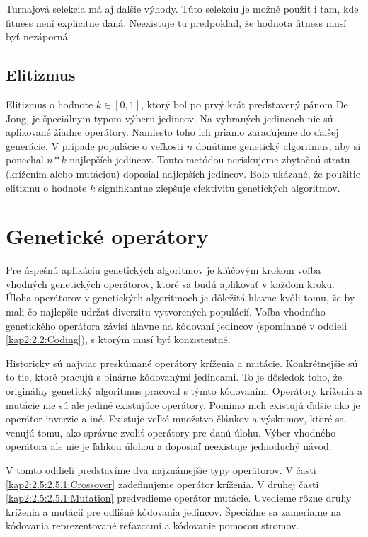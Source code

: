 Turnajová selekcia má aj ďalšie výhody.
Túto selekciu je možné použiť i tam, kde fitness není explicitne daná. Neexistuje tu predpoklad, že hodnota fitness musí byť nezáporná.

\subsection{Elitizmus}\label{kap2:2.4:2.4.3:Elitism}
Elitizmus o hodnote $k\in[0,1]$, ktorý bol po prvý krát predstavený pánom De Jong, je špeciálnym typom výberu jedincov. Na vybraných jedincoch nie sú aplikované žiadne operátory. Namiesto toho ich priamo zaraďujeme do ďalšej generácie. V prípade populácie o veľkosti $n$ donútime genetický algoritmus, aby si ponechal $n*k$ najlepších jedincov. Touto metódou neriskujeme zbytočnú stratu (krížením alebo mutáciou) doposiaľ najlepších jedincov. Bolo ukázané, že použitie elitizmu o hodnote $k$ signifikantne zlepšuje efektivitu genetických algoritmov.

\section{Genetické operátory}\label{kap2:2.5:Operators}
Pre úspešnú aplikáciu genetických algoritmov je kľúčovým krokom voľba vhodných genetických operátorov, ktoré sa budú aplikovať v každom kroku. Úloha operátorov v genetických algoritmoch je dôležitá hlavne kvôli tomu, že by mali čo najlepšie udržať diverzitu vytvorených populácií. Voľba vhodného genetického operátora závisí hlavne na kódovaní jedincov (spomínané v oddieli \ref{kap2:2.2:Coding}), s ktorým musí byť konzistentné.

Historicky sú najviac preskúmané operátory kríženia a mutácie. Konkrétnejšie sú to tie, ktoré pracujú s binárne kódovanými jedincami. To je dôsledok toho, že originálny genetický algoritmus pracoval s týmto kódovaním. Operátory kríženia a mutácie nie sú ale jediné existujúce operátory. Pomimo nich existujú ďalšie ako je operátor inverzie a iné.
Existuje veľké množstvo článkov a výskumov, ktoré sa venujú tomu, ako správne zvoliť operátory pre danú úlohu. Výber vhodného operátora ale nie je ľahkou úlohou a doposiaľ neexistuje jednoduchý návod.

V tomto oddieli predstavíme dva najznámejšie typy operátorov. V časti \ref{kap2:2.5:2.5.1:Crossover} zadefinujeme operátor kríženia. V druhej časti \ref{kap2:2.5:2.5.1:Mutation} predvedieme operátor mutácie. Uvedieme rôzne druhy kríženia a mutácií pre odlišné kódovania jedincov. Špeciálne sa zameriame na kódovania reprezentované reťazcami a kódovanie pomocou stromov.
